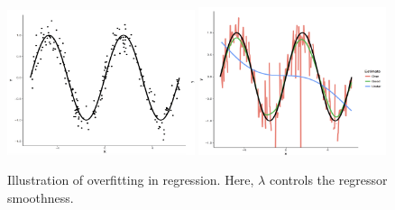 \documentclass[xcolor={usenames,dvipsnames},handout]{beamer}
\begin{document}
\begin{frame}
\begin{figure}
\begin{center}
\includegraphics[width=0.49\textwidth]{overfitting_reg1.png}
\includegraphics[width=0.49\textwidth]{overfitting_reg2.png}
\caption{Illustration of overfitting in regression. Here, $\lambda$ controls the regressor smoothness.}
\end{center}
\end{figure}
\end{frame}


 
\end{document}
